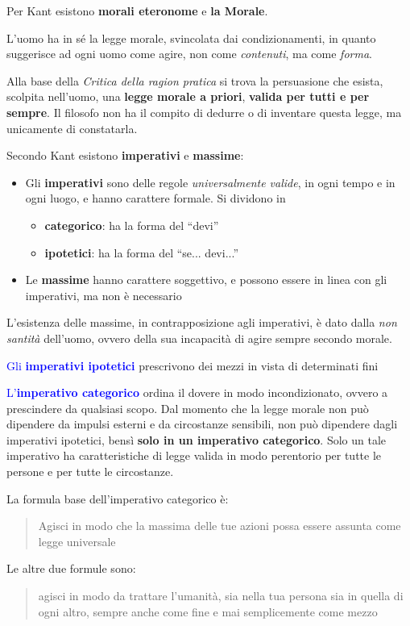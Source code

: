 \documentclass[a4paper, twoside, titlepage]{book}
\newcommand{\citazione}[1]{%
  \begin{quotation}
  #1
  \end{quotation}}
\renewcommand{\emph}[1]{\textcolor{blue}{#1}}
\begin{document}
Per Kant esistono \textbf{morali eteronome} e \textbf{la Morale}.

L’uomo ha in sé la legge morale, svincolata dai condizionamenti, in quanto suggerisce ad ogni uomo come agire, non come \textit{contenuti}, ma come \textit{forma}. 

Alla base della \textit{Critica della ragion pratica} si trova la persuasione che esista, scolpita nell’uomo, una \textbf{legge morale a priori}, \textbf{valida per tutti e per sempre}.
Il filosofo non ha il compito di dedurre o di inventare questa legge, ma unicamente di constatarla.

Secondo Kant esistono \textbf{imperativi} e \textbf{massime}:
\begin{itemize}
\item Gli \textbf{imperativi} sono delle regole \textit{universalmente valide}, in ogni tempo e in ogni luogo, e hanno carattere formale. Si dividono in 
\begin{itemize}
  \item \textbf{categorico}: ha la forma del “devi”
  \item \textbf{ipotetici}: ha la forma del “se... devi...”
  \end{itemize}
\item Le \textbf{massime} hanno carattere soggettivo, e possono essere in linea con gli imperativi, ma non è necessario
\end{itemize}
L’esistenza delle massime, in contrapposizione agli imperativi, è dato dalla \textit{non santità} dell’uomo, ovvero della sua incapacità di agire sempre secondo morale.

\emph{Gli \textbf{imperativi ipotetici}} prescrivono dei mezzi in vista di determinati fini

\emph{L’\textbf{imperativo categorico}} ordina il dovere in modo incondizionato, ovvero a prescindere da qualsiasi scopo.
Dal momento che la legge morale non può dipendere da impulsi esterni e da circostanze sensibili, non può dipendere dagli imperativi ipotetici, bensì \textbf{solo in un imperativo categorico}.
Solo un tale imperativo ha caratteristiche di legge valida in modo perentorio per tutte le persone e per tutte le circostanze.

La formula base dell’imperativo categorico è:
\citazione{Agisci in modo che la massima delle tue azioni possa essere assunta come legge universale}

Le altre due formule sono:
\citazione{agisci in modo da trattare l’umanità, sia nella tua persona sia in quella di ogni altro, sempre anche come fine e mai semplicemente come mezzo}
\end{document}

